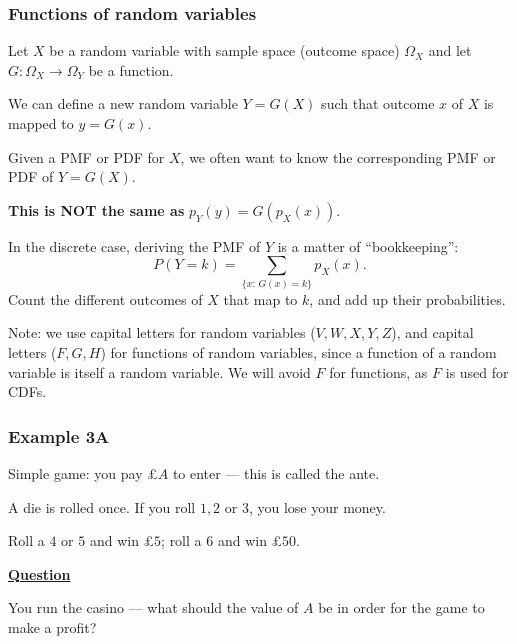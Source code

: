 \documentclass[t,8pt]{beamer}
\begin{document}
\begin{frame}
	\frametitle{Functions of random variables}
	Let $X$ be a random variable with sample space (outcome space) $\Omega_X$ and let $G:\Omega_X\rightarrow\Omega_Y$ be a function. \par
	We can define a new random variable $Y=G(X)$ such that outcome $x$ of $X$ is mapped to $y=G(x)$. \par
	Given a PMF or PDF for $X$, we often want to know the corresponding PMF or PDF of $Y=G(X)$. \par
	{\bf This is NOT the same as} $p_Y(y)=G(p_X(x))$. \par
	In the discrete case, deriving the PMF of $Y$ is a matter of ``bookkeeping'':
	$$P(Y=k)=\sum_{\{x:\,G(x)=k\}} p_X(x).$$
	{\small\color{NavyBlue} Count the different outcomes of $X$ that map to $k$, and add up their probabilities.} \par
	Note: we use capital letters for random variables ($V,W,X,Y,Z$), and capital letters ($F,G,H$) for functions of random variables, since a function of a random variable is itself a random variable. We will avoid $F$ for functions, as $F$ is used for CDFs.
\end{frame}

\begin{frame}
	\frametitle{Example 3A}
	Simple game: you pay \pounds$A$ to enter — this is called the ante. \par
	A die is rolled once. If you roll $1,2$ or $3$, you lose your money. \par
	Roll a $4$ or $5$ and win \pounds$5$; roll a $6$ and win \pounds$50$. \par
	{\bf\underline{Question}} \par
	You run the casino — what should the value of $A$ be in order for the game to make a profit?
\end{frame}
\end{document}
